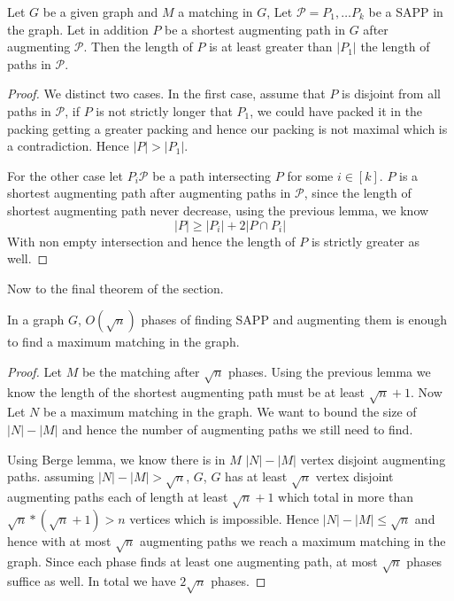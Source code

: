 \begin{lemma}
	Let $G$ be a given graph and $M$ a matching in $G$, Let $\mathcal{P} =  P_1, \dots P_k$ be a SAPP in the graph. Let in addition $P$ be a shortest augmenting path in $G$ after augmenting $\mathcal{P}$. Then the length of $P$ is at least greater than $|P_1|$ the length of paths in $\mathcal{P}$.
\end{lemma}
\begin{proof}
	We distinct two cases. In the first case, assume that $P$ is disjoint from all paths in $\mathcal{P}$, if $P$ is not strictly longer that $P_1$, we could have packed it in the packing getting a greater packing and hence our packing is not maximal which is a contradiction. Hence $|P| > |P_1|$.

	For the other case let $P_i \mathcal{P}$ be a path intersecting $P$ for some $i \in [k]$. $P$ is a shortest augmenting path after augmenting paths in $\mathcal{P}$, since the length of shortest augmenting path never decrease, using the previous lemma, we know
	$$|P| \geq |P_i| + 2 |P \cap P_i|$$  
	With non empty intersection and hence the length of $P$ is strictly greater as well.
\end{proof}

Now to the final theorem of the section.
\begin{theorem}
	In a graph $G$, $O(\sqrt n)$ phases of finding SAPP and augmenting them is enough to find a maximum matching in the graph.
\end{theorem}
\begin{proof}
	Let $M$ be the matching after $\sqrt n$ phases. Using the previous lemma we know the length of the shortest augmenting path must be at least $\sqrt n + 1$. Now Let $N$ be a maximum matching in the graph. We want to bound the size of $|N| - |M|$ and hence the number of augmenting paths we still need to find.

	Using Berge lemma, we know there is in $M$ $|N| - |M|$ vertex disjoint augmenting paths. assuming $|N| - |M| > \sqrt n$, $G$, $G$ has at least $\sqrt n$ vertex disjoint augmenting paths each of length at least $\sqrt n + 1$ which total in more than $\sqrt n * (\sqrt n + 1) > n$ vertices which is impossible. Hence $|N| - |M| \leq \sqrt n$ and hence with at most $\sqrt n$ augmenting paths we reach a maximum matching in the graph. Since each phase finds at least one augmenting path, at most $\sqrt n$ phases suffice as well. In total we have $2 \sqrt n$ phases.
\end{proof}

